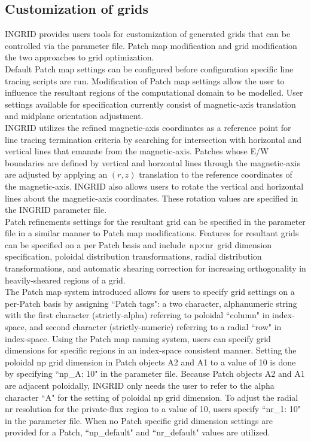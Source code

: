 \subsection{Customization of grids}
INGRID provides users tools for customization of generated grids that can be controlled via the parameter file. Patch map modification and grid modification the two approaches to grid optimization.\\ \indent
Default Patch map settings can be configured before configuration specific line tracing scripts are run. Modification of Patch map settings allow the user to influence the resultant regions of the computational domain to be modelled. User settings available for specification currently consist of magnetic-axis translation and midplane orientation adjustment.\\ \indent
INGRID utilizes the refined magnetic-axis coordinates as a reference point for line tracing termination criteria by searching for intersection with horizontal and vertical lines that emanate from the magnetic-axis. Patches whose E/W boundaries are defined by vertical and horzontal lines through the magnetic-axis are adjusted by applying an $(r,z)$ translation to the reference coordinates of the magnetic-axis. INGRID also allows users to rotate the vertical and horizontal lines about the magnetic-axis coordinates. These rotation values are specified in the INGRID parameter file.\\ \indent
Patch refinements settings for the resultant grid can be specified in the parameter file in a similar manner to Patch map modifications. Features for resultant grids can be specified on a per Patch basis and include $\text{np}\times\text{nr}$ grid dimension specification, poloidal distribution transformations, radial distribution transformations, and automatic shearing correction for increasing orthogonality in heavily-sheared regions of a grid.\\ \indent
The Patch map system introduced allows for users to specify grid settings on a per-Patch basis by assigning ``Patch tags": a two character, alphanumeric string with the first character (strictly-alpha) referring to poloidal ``column" in index-space, and second character (strictly-numeric) referring to a radial ``row" in index-space. Using the Patch map naming system, users can specify grid dimensions for specific regions in an index-space consistent manner. Setting the poloidal np grid dimension in Patch objects A2 and A1 to a value of 10 is done by specifying ``np\_A: 10" in the parameter file. Because Patch objects A2 and A1 are adjacent poloidally, INGRID only needs the user to refer to the alpha character ``A" for the setting of poloidal np grid dimension. To adjust the radial nr resolution for the private-flux region to a value of 10, users specify ``nr\_1: 10" in the parameter file. When no Patch specific grid dimension settings are provided for a Patch, ``np\_default" and ``nr\_default" values are utilized.\\ \indent
